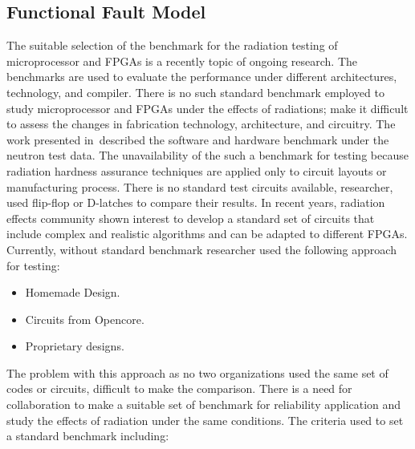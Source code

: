 \subsection{Functional Fault Model}






The suitable selection of the benchmark for the radiation testing of microprocessor and FPGAs is a recently topic of ongoing research. The benchmarks are used to evaluate the performance under different architectures, technology, and compiler. There is no such standard benchmark employed to study microprocessor and FPGAs under the effects of radiations; make it difficult to assess the changes in fabrication technology, architecture, and circuitry. The work presented in~\cite{quinn2015using}described the software and hardware benchmark under the neutron test data. The unavailability of the such a benchmark for testing because radiation hardness assurance techniques are applied only to circuit layouts or manufacturing process. There is no standard test circuits available, researcher, used flip-flop or D-latches to compare their results. In recent years, radiation effects community shown interest to develop a standard set of circuits that include complex and realistic algorithms and can be adapted to different FPGAs.  Currently, without standard benchmark researcher used the following approach for testing:

\begin{itemize}


\item Homemade Design.
\item Circuits from Opencore.
\item Proprietary designs.
\end{itemize}


The problem with this approach as no two organizations used the same set of codes or circuits, difficult to make the comparison. There is a need for collaboration to make a suitable set of benchmark for reliability application and study the effects of radiation under the same conditions. The criteria used to set a standard benchmark including:

